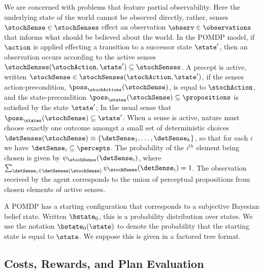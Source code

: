 \documentclass[letterpaper]{article}
\begin{document}
We are concerned with problems that feature partial
observability. Here the underlying state of the world cannot be
observed directly, rather, senses $\stochSense \in \stochSenses$
effect an observation $\observ \in \observations$ that informs what
should be believed about the world. In the POMDP model, if $\action$
is applied effecting a transition to a successor state $\state'$, then
an observation occurs according to the active senses
$\stochSenses(\stochAction, \state') \subseteq \stochSenses$. A
precept is active, written $\stochSense \in
\stochSenses(\stochAction, \state')$, if the senses
action-precondition, $\poss_\stochActions(\stochSense)$, is equal to
$\stochAction$, and the state-precondition
$\poss_\states(\stochSense) \subseteq \propositions$ is satisfied by
the state $\state'$; In the usual sense that
$\poss_\states(\stochSense) \subseteq \state'$.
When a sense is active, nature must choose exactly one outcome amongst
a small set of deterministic choices $\detSenses(\stochSense)
\equiv \{\detSense_1, \ldots, \detSense_k \}$, so that for each
$i$ we have $\detSense_i \subseteq \percepts$. The probability of
the $i^{th}$ element being chosen is given by
$\psi_{\stochSense}(\detSense_i)$, where $\sum_{\detSense_i \in
\detSenses(\stochSense)} \psi_{\stochSense}(\detSense_i) =
1$. The observation received by the agent corresponds to the union of
perceptual propositions from chosen elements of active senses.

A POMDP has a starting configuration that corresponds to a subjective
Bayesian belief state. Written $\bstate_0$, this is a probability
distribution over states. We use the notation $\bstate_0(\state)$ to
denote the probability that the starting state is equal to
$\state$. We suppose this is given in a factored tree format. 



\subsection{Costs, Rewards, and Plan Evaluation}
\end{document}
